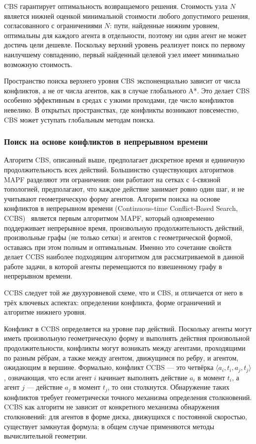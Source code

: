 CBS гарантирует оптимальность возвращаемого решения. Стоимость узла $N$ является нижней оценкой
минимальной стоимости любого допустимого решения, согласованного с ограничениями $N$: пути,
найденные нижним уровнем, оптимальны для каждого агента в отдельности, поэтому ни один агент не
может достичь цели дешевле. Поскольку верхний уровень реализует поиск по первому наилучшему
совпадению, первый найденный целевой узел имеет минимально возможную стоимость.

Пространство поиска верхнего уровня CBS экспоненциально зависит от числа конфликтов, а не от числа
агентов, как в случае глобального A*. Это делает CBS особенно эффективным в средах с узкими
проходами, где число конфликтов невелико. В открытых пространствах, где
конфликты возникают повсеместно, CBS может уступать глобальным методам поиска.

\subsubsection{Поиск на основе конфликтов в непрерывном времени}

Алгоритм CBS, описанный выше, предполагает дискретное время и единичную продолжительность всех
действий. Большинство существующих алгоритмов MAPF разделяют эти ограничения: они работают на
сетках с 4-связной топологией, предполагают, что каждое действие занимает ровно один шаг, и не
учитывают геометрическую форму агентов. Алгоритм поиска на основе конфликтов в непрерывном времени
(Continuous-time Conflict-Based Search, CCBS)~\cite{ccbs} является первым алгоритмом MAPF, который одновременно
поддерживает непрерывное время, произвольную продолжительность действий, произвольные графы (не
только сетки) и агентов с геометрической формой, оставаясь при этом полным и оптимальным. Именно
это сочетание свойств делает CCBS наиболее подходящим алгоритмом для рассматриваемой в данной
работе задачи, в которой агенты перемещаются по взвешенному графу в непрерывном времени.

CCBS следует той же двухуровневой схеме, что и CBS, и отличается от него в трёх ключевых аспектах:
определении конфликта, форме ограничений и алгоритме нижнего уровня.

Конфликт в CCBS определяется на уровне пар действий. Поскольку агенты могут иметь произвольную
геометрическую форму и выполнять действия произвольной продолжительности, конфликты могут возникать
между агентами, проходящими по разным рёбрам, а также между агентом, движущимся по ребру, и
агентом, ожидающим в вершине. Формально, конфликт CCBS --- это четвёрка
$\langle a_i, t_i, a_j, t_j \rangle$, означающая, что если агент $i$ начинает выполнять действие
$a_i$ в момент $t_i$, а агент $j$ --- действие $a_j$ в момент $t_j$, то они столкнутся. Обнаружение
таких конфликтов требует геометрически точного механизма определения столкновений. CCBS как алгоритм
не зависит от конкретного механизма обнаружения столкновений: для агентов в форме диска,
движущихся с постоянной скоростью, существует замкнутая формула; в общем случае применяются
методы вычислительной геометрии.

